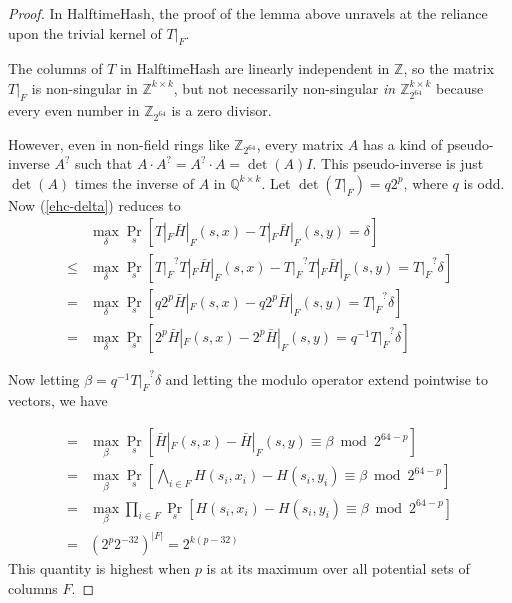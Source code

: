 \documentclass[sigconf, nonacm]{acmart}
\newcommand{\rats}{\mathbb{Q}}
\newcommand{\ints}{\mathbb{Z}}
\begin{document}
\begin{proof}
  In HalftimeHash, the proof of the lemma above unravels at the reliance upon the trivial kernel of $T|_F$.

  The columns of $T$ in HalftimeHash are linearly independent in $\ints$, so the matrix $T|_F$ is non-singular in $\ints^{k\times{}k}$, but not necessarily non-singular {\em in $\ints_{2^{64}}^{k\times{}k}$} because every even number in $\ints_{2^{64}}$ is a zero divisor.

  However, even in non-field rings like $\ints_{2^{64}}$, every matrix $A$ has a kind of pseudo-inverse $A^?$ such that $A \cdot A^? = A^? \cdot A = \det(A) I$.
  This pseudo-inverse is just $\det(A)$ times the inverse of $A$ in $\rats^{k\times{}k}$.
  Let $\det(T|_F) = q2^p$, where $q$ is odd.
  Now (\ref{ehc-delta}) reduces to
  \[
  \begin{array}{rl}
    &  \max_\delta \Pr_s[T|_F \bar{H}|_F(s,x) - T|_F \bar{H}|_F(s,y) = \delta]\\
    \leq & \max_\delta \Pr_s[{T|_F}^? T|_F \bar{H}|_F(s,x) - {T|_F}^? T|_F \bar{H}|_F(s,y) = {T|_F}^? \delta] \\
    = & \max_\delta \Pr_s[q2^p\bar{H}|_F(s,x) - q2^p\bar{H}|_F(s,y) = {T|_F}^? \delta] \\
    = & \max_\delta \Pr_s[2^p\bar{H}|_F(s,x) - 2^p\bar{H}|_F(s,y) = q^{-1} {T|_F}^? \delta]
  \end{array}
  \]

  Now letting $\beta = q^{-1} {T|_F}^? \delta$ and letting the modulo operator extend pointwise to vectors, we have

  \[
  \begin{array}{rl}
    = & \max_\beta \Pr_s[\bar{H}|_F(s,x) - \bar{H}|_F(s,y) \equiv \beta \bmod 2^{64-p}] \\
    = & \max_\beta \Pr_s\left[\bigwedge_{i \in F} H(s_i,x_i) - H(s_i,y_i) \equiv \beta \bmod 2^{64-p}\right] \\
    = & \max_\beta \prod_{i \in F} \Pr_s\left[ H(s_i,x_i) - H(s_i,y_i) \equiv \beta \bmod 2^{64-p}\right] \\
    = & \left(2^p 2^{-32}\right)^{|F|} = 2^{k(p-32)}
  \end{array}
  \]
  This quantity is highest when $p$ is at its maximum over all potential sets of columns $F$.

  
\end{proof}
\end{document}
